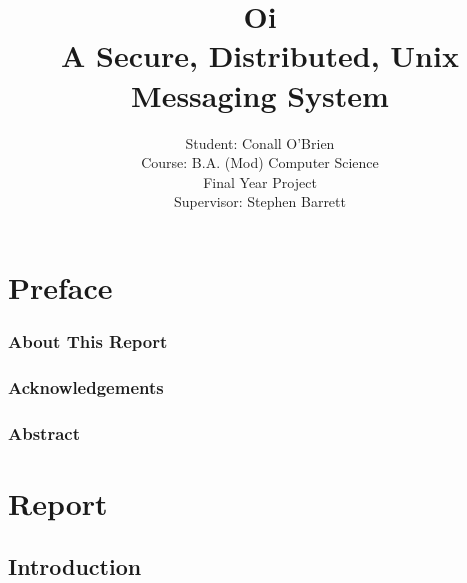 \documentclass[a4paper,12pt]{report}
\begin{document}
\title{Oi \\ A Secure, Distributed, Unix Messaging System}

\author{Student: Conall O'Brien \\ 
		  Course:  B.A. (Mod) Computer Science \\
		  Final Year Project \\ 
		  Supervisor: Stephen Barrett} 


\date{}
\maketitle


\part*{Preface}


\section{About This Report}



\pagebreak


\section{Acknowledgements}



\pagebreak

\section{Abstract}



\tableofcontents

\listoftables

\listoffigures


\part*{Report}


\chapter{Introduction}

\setcounter{page}{13}
\end{document}
